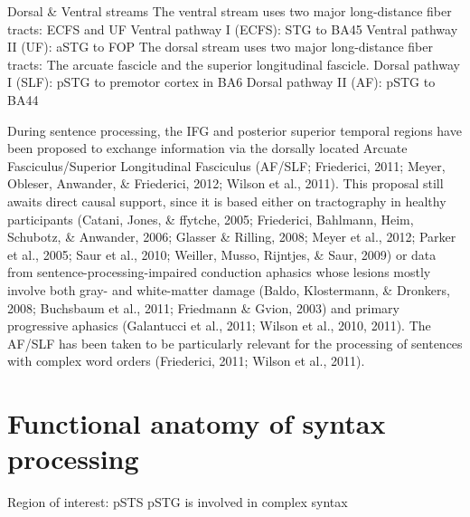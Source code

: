 Dorsal \& Ventral streams
The ventral stream uses two major long-distance fiber tracts: ECFS and UF
Ventral pathway I (ECFS): STG to BA45
Ventral pathway II (UF): aSTG to FOP
The dorsal stream uses two major long-distance fiber tracts: The arcuate fascicle and the superior longitudinal fascicle.
Dorsal pathway I (SLF): pSTG to premotor cortex in BA6
Dorsal pathway II (AF): pSTG to BA44

During sentence processing, the IFG and posterior superior temporal regions have been proposed to exchange information via
 the dorsally located Arcuate Fasciculus/Superior Longitudinal Fasciculus (AF/SLF; Friederici, 2011; Meyer, Obleser, Anwander, \& Friederici, 2012; Wilson et al., 2011). This proposal still awaits direct causal support, since it is based either on tractography in healthy participants (Catani, Jones, \& ffytche, 2005; Friederici, Bahlmann, Heim, Schubotz, \& Anwander, 2006; Glasser \& Rilling, 2008; Meyer et al., 2012; Parker et al., 2005; Saur et al., 2010; Weiller, Musso, Rijntjes, \& Saur, 2009) or data from sentence-processing-impaired conduction aphasics whose lesions mostly involve both gray- and white-matter damage (Baldo, Klostermann, \& Dronkers, 2008; Buchsbaum et al., 2011; Friedmann \& Gvion, 2003) and primary progressive aphasics (Galantucci et al., 2011; Wilson et al., 2010, 2011). The AF/SLF has been taken to be particularly relevant for the
 processing of sentences with complex word orders (Friederici,
 2011; Wilson et al., 2011).

\section{Functional anatomy of syntax processing}

Region of interest: pSTS
pSTG is involved in complex syntax

